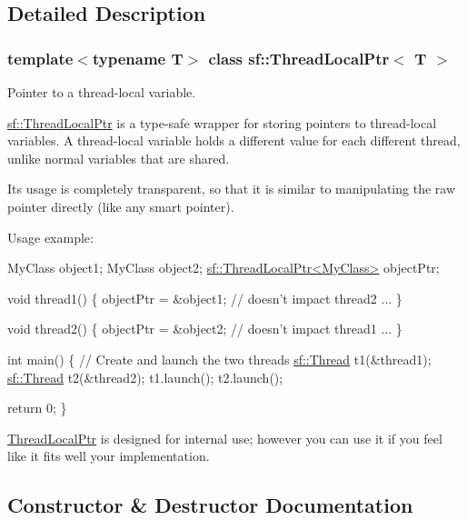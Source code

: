 \subsection{Detailed Description}
\subsubsection*{template$<$typename T$>$\newline
class sf\+::\+Thread\+Local\+Ptr$<$ T $>$}

Pointer to a thread-\/local variable. 

\hyperlink{classsf_1_1_thread_local_ptr}{sf\+::\+Thread\+Local\+Ptr} is a type-\/safe wrapper for storing pointers to thread-\/local variables. A thread-\/local variable holds a different value for each different thread, unlike normal variables that are shared.

Its usage is completely transparent, so that it is similar to manipulating the raw pointer directly (like any smart pointer).

Usage example\+: 
\begin{DoxyCode}
MyClass object1;
MyClass object2;
\hyperlink{classsf_1_1_thread_local_ptr}{sf::ThreadLocalPtr<MyClass>} objectPtr;

\textcolor{keywordtype}{void} thread1()
\{
    objectPtr = &object1; \textcolor{comment}{// doesn't impact thread2}
    ...
\}

\textcolor{keywordtype}{void} thread2()
\{
    objectPtr = &object2; \textcolor{comment}{// doesn't impact thread1}
    ...
\}

\textcolor{keywordtype}{int} main()
\{
    \textcolor{comment}{// Create and launch the two threads}
    \hyperlink{classsf_1_1_thread}{sf::Thread} t1(&thread1);
    \hyperlink{classsf_1_1_thread}{sf::Thread} t2(&thread2);
    t1.launch();
    t2.launch();

    \textcolor{keywordflow}{return} 0;
\}
\end{DoxyCode}


\hyperlink{classsf_1_1_thread_local_ptr}{Thread\+Local\+Ptr} is designed for internal use; however you can use it if you feel like it fits well your implementation. 

\subsection{Constructor \& Destructor Documentation}
\mbox{\label{classsf_1_1_thread_local_ptr_a8c678211d7828d2a8c41cb534422d649}} 
